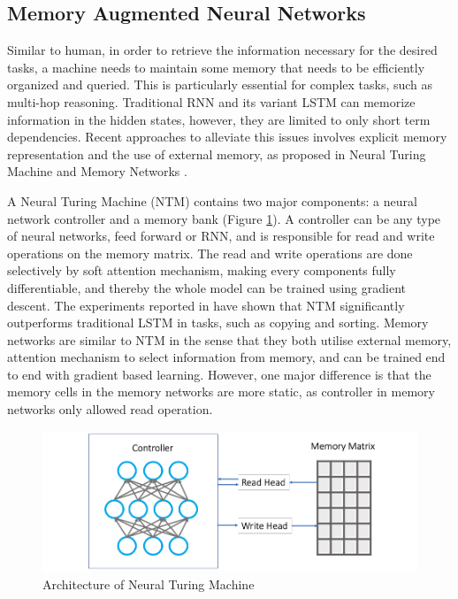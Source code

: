 \documentclass[journal]{IEEEtran}
\begin{document}
\subsection{Memory Augmented Neural Networks}
Similar to human, in order to retrieve the information necessary for the desired tasks, a machine needs to maintain some memory that needs to be efficiently organized and queried. 
This is particularly essential for complex tasks, such as multi-hop reasoning. Traditional RNN and its variant LSTM can memorize information in the hidden states,
however, they are limited to only short term dependencies. Recent approaches to alleviate this issues involves explicit memory representation and the use of external memory, 
as proposed in Neural Turing Machine \cite{graves2014neural} and Memory Networks \cite{weston2014memory}. 

A Neural Turing Machine (NTM) contains two major components: a neural network controller and a memory bank (Figure \ref{NTM}). 
A controller can be any type of neural networks, feed forward or RNN, and is responsible for read and write operations on the memory matrix.
The read and write operations are done selectively by soft attention mechanism, making every components fully differentiable, 
and thereby the whole model can be trained using gradient descent. The experiments reported in \cite{graves2014neural} have shown that NTM significantly
outperforms traditional LSTM in tasks, such as copying and sorting. Memory networks \cite{graves2014neural} are similar to NTM in the sense that they both utilise external memory, attention mechanism to select information from memory, and
can be trained end to end with gradient based learning. However, one major difference is that the memory cells in the memory networks are more static, 
as controller in memory networks only allowed read operation.

\begin{figure}[htb]
  \centering
  \includegraphics[width=0.8\columnwidth]{NTM.png}
  \caption{Architecture of Neural Turing Machine}
  \label{NTM}
\end{figure}
\end{document}
